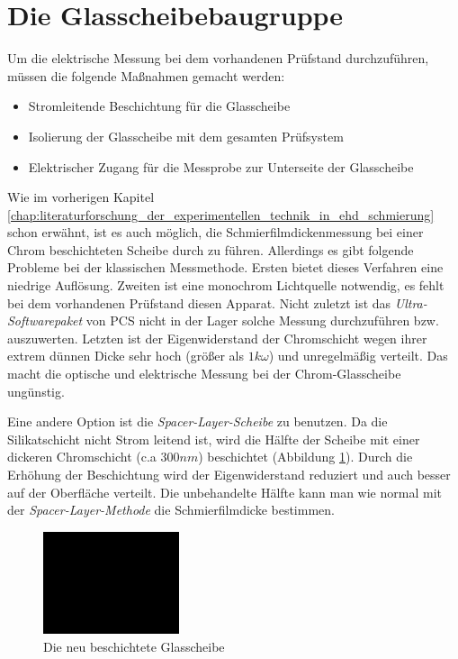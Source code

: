 \section{Die Glasscheibebaugruppe}
\label{sec:die_glasscheibebaugruppe}

Um die elektrische Messung bei dem vorhandenen Prüfstand durchzuführen, müssen die folgende Maßnahmen gemacht werden:
\begin{itemize}
    \item Stromleitende Beschichtung für die Glasscheibe
    \item Isolierung der Glasscheibe mit dem gesamten Prüfsystem
    \item Elektrischer Zugang für die Messprobe zur Unterseite der Glasscheibe
\end{itemize}

Wie im vorherigen Kapitel \ref{chap:literaturforschung_der_experimentellen_technik_in_ehd_schmierung} schon erwähnt, ist es auch möglich, die Schmierfilmdickenmessung bei einer Chrom beschichteten Scheibe durch zu führen.
Allerdings es gibt folgende Probleme bei der klassischen Messmethode.
Ersten bietet dieses Verfahren eine niedrige Auflösung. Zweiten ist eine monochrom Lichtquelle notwendig, es fehlt bei dem vorhandenen Prüfstand diesen Apparat.
Nicht zuletzt ist das \textit{Ultra-Softwarepaket} von PCS nicht in der Lager solche Messung durchzuführen bzw. auszuwerten.
Letzten ist der Eigenwiderstand der Chromschicht wegen ihrer extrem dünnen Dicke sehr hoch (größer als $1 k\omega$) und unregelmäßig verteilt.
\label{chap:literaturforschung_der_experimentellen_technik_in_ehd_schmierung}
Das macht die optische und elektrische Messung bei der Chrom-Glasscheibe ungünstig.

Eine andere Option ist die \textit{Spacer-Layer-Scheibe} zu benutzen.
Da die Silikatschicht nicht Strom leitend ist, wird die Hälfte der Scheibe mit einer dickeren Chromschicht (c.a $300 nm$) beschichtet (Abbildung \ref{fig:die_neu_beschichtet_glassscheibe}).
Durch die Erhöhung der Beschichtung wird der Eigenwiderstand reduziert und auch besser auf der Oberfläche verteilt.
Die unbehandelte Hälfte kann man wie normal mit der \textit{Spacer-Layer-Methode} die Schmierfilmdicke bestimmen.
\begin{figure}[htb]
    \centering
    \includegraphics[width=4cm]{./images/blank_img.jpg}
    \caption{Die neu beschichtete Glasscheibe}
    \label{fig:die_neu_beschichtet_glassscheibe}
\end{figure}
%

